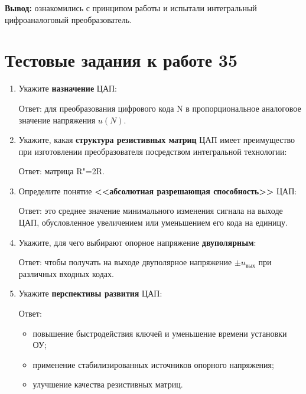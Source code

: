 \documentclass[spec, och, labwork]{shiza}
\begin{document}
\textbf{Вывод:} ознакомились с принципом работы и испытали интегральный
цифроаналоговый преобразователь.


\section*{Тестовые задания к работе 35}

\begin{enumerate}
    \item 
        Укажите \textbf{назначение} ЦАП:

        Ответ: для преобразования цифрового кода N в пропорциональное аналоговое
        значение напряжения $u(N)$.

    \item
        Укажите, какая \textbf{структура резистивных матриц} ЦАП имеет
        преимущество при изготовлении преобразователя посредством интегральной
        технологии:

        Ответ: матрица R"=2R.

    \item
        Определите понятие \textbf{<<абсолютная разрешающая
        способность>>} ЦАП:

        Ответ: это среднее значение минимального изменения сигнала на выходе ЦАП,
        обусловленное увеличением или уменьшением его кода на единицу.

    \item
        Укажите, для чего выбирают опорное напряжение
        \textbf{двуполярным}:

        Ответ: чтобы получать на выходе двуполярное напряжение $\pm u_\text{вых}$ при
        различных входных кодах.

    \item
        Укажите \textbf{перспективы развития} ЦАП:

        Ответ:
        
        \begin{itemize}
            \item повышение быстродействия ключей и уменьшение времени установки ОУ;
            \item применение стабилизированных источников опорного напряжения;
            \item улучшение качества резистивных матриц.
        \end{itemize}
\end{enumerate}
\end{document}

